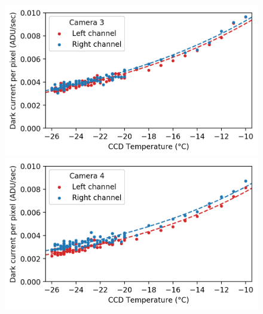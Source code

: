 \begin{colsection}
\begin{colsection}
\begin{figure}[p]
\begin{center}
        \begin{minipage}[t]{0.49\textwidth}\vspace{10pt}
            \includegraphics[width=\linewidth]{images/detectors/dc_3.png}
        \end{minipage}
        \begin{minipage}[t]{0.49\textwidth}\vspace{10pt}
            \includegraphics[width=\linewidth]{images/detectors/dc_4.png}
        \end{minipage}


\end{center}
\end{figure}
\end{colsection}
\end{colsection}
